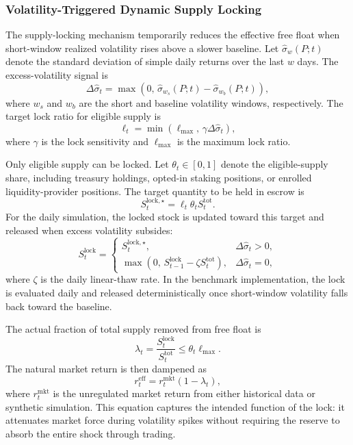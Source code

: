 \documentclass[a4paper,fleqn]{cas-dc}
\begin{document}
\subsubsection{Volatility-Triggered Dynamic Supply Locking}

The supply-locking mechanism temporarily reduces the effective free float when short-window realized volatility rises above a slower baseline. Let $\widehat{\sigma}_w(P;t)$ denote the standard deviation of simple daily returns over the last $w$ days. The excess-volatility signal is
\begin{equation}
\Delta \widehat{\sigma}_t
=
\max
\left(
0,\,
\widehat{\sigma}_{w_s}(P;t)
-
\widehat{\sigma}_{w_b}(P;t)
\right),
\label{eq:excess_vol}
\end{equation}
where $w_s$ and $w_b$ are the short and baseline volatility windows, respectively. The target lock ratio for eligible supply is
\begin{equation}
\ell_t
=
\min
\left(
\ell_{\max},\,
\gamma \Delta \widehat{\sigma}_t
\right),
\label{eq:lock_ratio}
\end{equation}
where $\gamma$ is the lock sensitivity and $\ell_{\max}$ is the maximum lock ratio.

Only eligible supply can be locked. Let $\theta_t\in[0,1]$ denote the eligible-supply share, including treasury holdings, opted-in staking positions, or enrolled liquidity-provider positions. The target quantity to be held in escrow is
\begin{equation}
S_t^{\mathrm{lock},\star}
=
\ell_t \theta_t S_t^{\mathrm{tot}}.
\label{eq:lock_stock_target}
\end{equation}
For the daily simulation, the locked stock is updated toward this target and released when excess volatility subsides:
\begin{equation}
S_t^{\mathrm{lock}}
=
\begin{cases}
S_t^{\mathrm{lock},\star}, & \Delta \widehat{\sigma}_t>0,\\[4pt]
\max\left(0,\,S_{t-1}^{\mathrm{lock}}-\zeta S_t^{\mathrm{tot}}\right), & \Delta \widehat{\sigma}_t=0,
\end{cases}
\label{eq:lock_stock}
\end{equation}
where $\zeta$ is the daily linear-thaw rate. In the benchmark implementation, the lock is evaluated daily and released deterministically once short-window volatility falls back toward the baseline.

The actual fraction of total supply removed from free float is
\begin{equation}
\lambda_t
=
\frac{S_t^{\mathrm{lock}}}{S_t^{\mathrm{tot}}}
\leq
\theta_t \ell_{\max}.
\label{eq:free_float_reduction}
\end{equation}
The natural market return is then dampened as
\begin{equation}
r_{t}^{\mathrm{eff}}
=
r_{t}^{\mathrm{mkt}}
(1-\lambda_t),
\label{eq:effective_return}
\end{equation}
where $r_t^{\mathrm{mkt}}$ is the unregulated market return from either historical data or synthetic simulation. This equation captures the intended function of the lock: it attenuates market force during volatility spikes without requiring the reserve to absorb the entire shock through trading.
\end{document}
